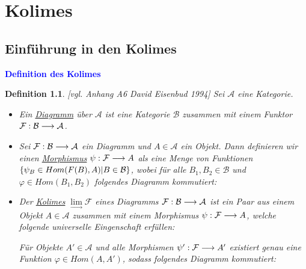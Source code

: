 \documentclass[10pt,a4paper]{report}
\newcommand{\ModulsOfDifferenzials}{David Eisenbud 1994}
\newcounter{Aussage}[chapter]
\newtheorem{definition}[Aussage]{Definition}
\newcommand{\functionfront}[3]{\nolinebreak{#1:#2 \longrightarrow #3}}
\newcommand{\colimes}[0]{\lim\limits_{ \longrightarrow }}
\begin{document}
\chapter{Kolimes}
\section{Einführung in den Kolimes}
\textcolor{blue}{\textbf{Definition des Kolimes}}
\begin{definition}\label{Definition des Kolimes} \textit{[vgl. Anhang A6 \ModulsOfDifferenzials]}
Sei $\mathcal{A}$ eine Kategorie.
\begin{itemize}
\item Ein \underline{Diagramm} über $\mathcal{A}$ ist eine Kategorie $\mathcal{B}$ zusammen mit einem Funktor $\functionfront{\mathcal{F}}{\mathcal{B}}{\mathcal{A}}$.
\item Sei $\functionfront{\mathcal{F}}{\mathcal{B}}{\mathcal{A}}$ ein Diagramm und $A \in \mathcal{A}$ ein Objekt. Dann definieren wir einen \underline{Morphismus} $\functionfront{\psi}{\mathcal{F}}{A}$ als eine Menge von Funktionen 
$\nolinebreak{\lbrace \psi_B \in Hom(F(B),A) \vert B \in \mathcal{B} \rbrace}$, wobei für alle $B_1,B_2 \in \mathcal{B}$ und $\varphi \in Hom(B_1,B_2)$ folgendes Diagramm kommutiert:
\begin{center}
\end{center}
\item Der \underline{Kolimes} $\colimes \mathcal{F}$ eines Diagramms $\functionfront{\mathcal{F}}{\mathcal{B}}{\mathcal{A}}$ ist ein Paar aus einem Objekt $A \in \mathcal{A}$ zusammen mit einem Morphismus $\functionfront{\psi}{\mathcal{F}}{A}$, welche folgende universelle Eingenschaft erfüllen:
\begin{center}
Für Objekte $A' \in \mathcal{A}$ und alle Morphismen $\functionfront{\psi '}{\mathcal{F}}{A'}$ existiert genau eine Funktion $\varphi \in Hom(A,A')$, sodass folgendes Diagramm kommutiert:
\end{center}
\end{itemize}
\end{definition}
\end{document}
